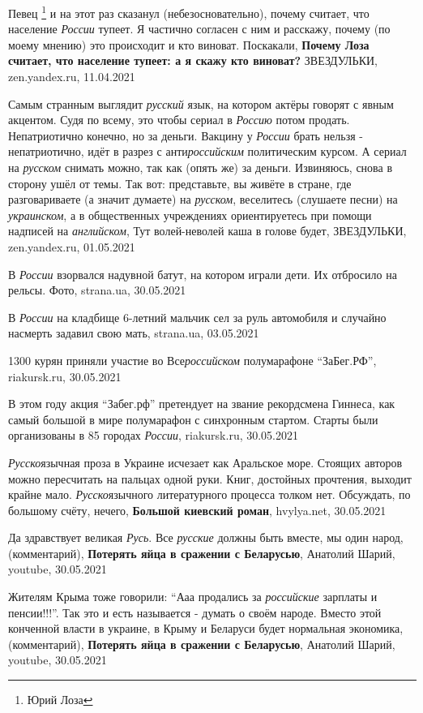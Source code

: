 Певец \footnote{Юрий Лоза} и на этот раз сказанул (небезосновательно), почему
считает, что население \emph{России} тупеет. Я частично согласен с ним и
расскажу, почему (по моему мнению) это происходит и кто виноват. Поскакали,
\textbf{Почему Лоза считает, что население тупеет: а я скажу кто виноват?}
ЗВЕЗДУЛЬКИ, zen.yandex.ru, 11.04.2021

Самым странным выглядит \emph{русский} язык, на котором актёры говорят с явным
акцентом. Судя по всему, это чтобы сериал в \emph{Россию} потом продать.
Непатриотично конечно, но за деньги. Вакцину у \emph{России} брать нельзя -
непатриотично, идёт в разрез с анти\emph{российским} политическим курсом. А сериал на
\emph{русском} снимать можно, так как (опять же) за деньги.  Извиняюсь, снова в
сторону ушёл от темы. Так вот: представьте, вы живёте в стране, где
разговариваете (а значит думаете) на \emph{русском}, веселитесь (слушаете
песни) на \emph{украинском}, а в общественных учреждениях ориентируетесь при
помощи надписей на \emph{английском}, Тут волей-неволей каша в голове будет,
ЗВЕЗДУЛЬКИ, zen.yandex.ru, 01.05.2021

В \emph{России} взорвался надувной батут, на котором играли дети. Их отбросило
на рельсы. Фото, strana.ua, 30.05.2021

В \emph{России} на кладбище 6-летний мальчик сел за руль автомобиля и случайно
насмерть задавил свою мать, strana.ua, 03.05.2021

1300 курян приняли участие во Все\emph{российском} полумарафоне
\enquote{ЗаБег.РФ}, riakursk.ru, 30.05.2021

В этом году акция \enquote{Забег.рф} претендует на звание рекордсмена Гиннеса,
как самый большой в мире полумарафон с синхронным стартом. Старты были
организованы в 85 городах \emph{России}, riakursk.ru, 30.05.2021

\emph{Русско}язычная проза в Украине исчезает как Аральское море. Стоящих
авторов можно пересчитать на пальцах одной руки. Книг, достойных прочтения,
выходит крайне мало. \emph{Русско}язычного литературного процесса толком нет.
Обсуждать, по большому счёту, нечего, \textbf{Большой киевский роман},
hvylya.net, 30.05.2021

Да здравствует великая \emph{Русь}. Все \emph{русские} должны быть вместе, мы
один народ, (комментарий), \textbf{Потерять яйца в сражении с Беларусью},
Анатолий Шарий, youtube, 30.05.2021

Жителям Крыма тоже говорили: \enquote{Ааа продались за \emph{российские} зарплаты и
пенсии!!!}. Так это и есть называется - думать о своём народе. Вместо этой
конченной власти в украине, в Крыму и Беларуси будет нормальная экономика,
(комментарий), \textbf{Потерять яйца в сражении с Беларусью}, Анатолий Шарий,
youtube, 30.05.2021

